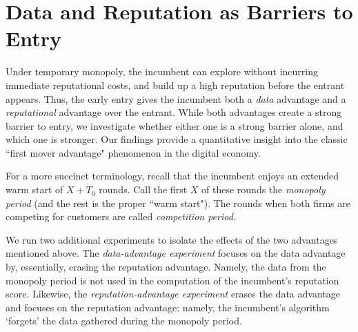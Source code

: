 \documentclass[../competing_bandits.tex]{subfiles}
\begin{document}
\section{Data and Reputation as Barriers to Entry}\label{section:6}

Under temporary monopoly, the incumbent can explore without incurring immediate reputational costs, and build up a high reputation before the entrant appears. Thus, the early entry gives the incumbent both a \textit{data} advantage and a \textit{reputational} advantage over the entrant. While both advantages create a strong barrier to entry, we investigate whether either one is a strong barrier alone, and which one is stronger. Our findings provide a quantitative insight into the classic ``first mover advantage" phenomenon in the digital economy.

For a more succinct terminology, recall that the incumbent enjoys an extended warm start of $X+T_0$ rounds. Call the first $X$ of these rounds the \emph{monopoly period} (and the rest is the proper ``warm start"). The rounds when both firms are competing for customers are called \emph{competition period.}

We run two additional experiments to isolate the effects of the two
advantages mentioned above. The \emph{data-advantage experiment} focuses on the data advantage by, essentially, erasing the reputation advantage. Namely, the data from the monopoly period is not used in the computation of the incumbent's reputation score. Likewise, the \emph{reputation-advantage experiment} erases the data advantage and focuses on the reputation advantage: namely, the incumbent's algorithm `forgets' the data gathered during the monopoly period. 
\end{document}
